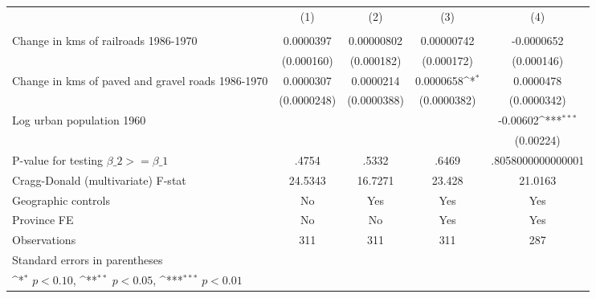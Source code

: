 {
\def\sym#1{\ifmmode^{#1}\else\(^{#1}\)\fi}
\begin{tabular}{l*{4}{c}}
\hline\hline
                &\multicolumn{1}{c}{(1)}&\multicolumn{1}{c}{(2)}&\multicolumn{1}{c}{(3)}&\multicolumn{1}{c}{(4)}\\
                &\multicolumn{1}{c}{}&\multicolumn{1}{c}{}&\multicolumn{1}{c}{}&\multicolumn{1}{c}{}\\
\hline
Change in kms of railroads 1986-1970&0.0000397         &0.00000802         &0.00000742         &-0.0000652         \\
                &(0.000160)         &(0.000182)         &(0.000172)         &(0.000146)         \\
[1em]
Change in kms of paved and gravel roads 1986-1970&0.0000307         &0.0000214         &0.0000658\sym{*}  &0.0000478         \\
                &(0.0000248)         &(0.0000388)         &(0.0000382)         &(0.0000342)         \\
[1em]
Log urban population 1960&                  &                  &                  & -0.00602\sym{***}\\
                &                  &                  &                  &(0.00224)         \\
\hline
P-value for testing $\beta\_{2} >= \beta\_{1}$&    .4754         &    .5332         &    .6469         &.8058000000000001         \\
Cragg-Donald (multivariate) F-stat&  24.5343         &  16.7271         &   23.428         &  21.0163         \\
Geographic controls&       No         &      Yes         &      Yes         &      Yes         \\
Province FE     &       No         &       No         &      Yes         &      Yes         \\
Observations    &      311         &      311         &      311         &      287         \\
\hline\hline
\multicolumn{5}{l}{\footnotesize Standard errors in parentheses}\\
\multicolumn{5}{l}{\footnotesize \sym{*} \(p<0.10\), \sym{**} \(p<0.05\), \sym{***} \(p<0.01\)}\\
\end{tabular}
}
